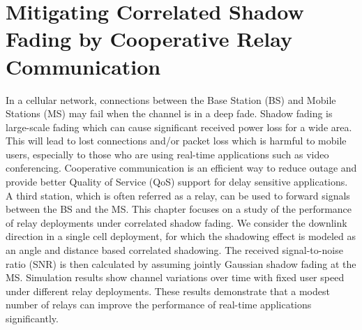 \chapter{Mitigating Correlated Shadow Fading by Cooperative Relay Communication}\label{ch:2}
\par In a cellular network, connections between the Base Station (BS) and Mobile Stations (MS) may fail when the channel is in a deep fade. Shadow fading is large-scale fading which can cause significant received power loss for a wide area. This will lead to lost connections and/or packet loss which is harmful to mobile users, especially to those who are using real-time applications such as video conferencing. Cooperative communication is an efficient way to reduce outage and provide better Quality of Service (QoS) support for delay sensitive applications. A third station, which is often referred as a relay, can be used to forward signals between  the BS and the MS. This chapter focuses on a study of the performance of relay deployments under correlated shadow fading. We consider the downlink direction in a single cell deployment, for which the shadowing effect is modeled as an angle and distance  based correlated shadowing. The received signal-to-noise ratio (SNR) is then calculated by assuming jointly Gaussian shadow fading at the MS. Simulation results show channel variations over time with fixed user speed under different relay deployments. These results demonstrate that a modest number of relays can improve the performance of real-time applications significantly.
